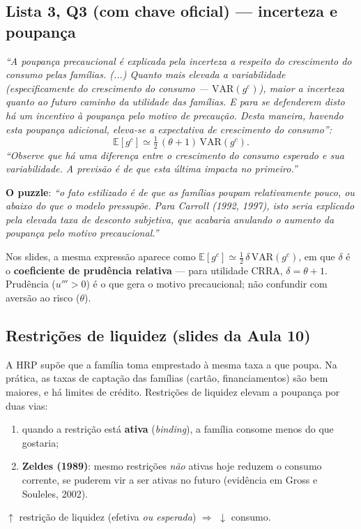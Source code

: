 \documentclass[12pt, a4paper]{article}
\newcommand{\E}{\mathbb{E}}
\newcommand{\VAR}{\mathrm{VAR}}
\begin{document}
\subsection{Lista 3, Q3 (com chave oficial) --- incerteza e poupança}

\begin{correctbox}[title={Chave oficial (Q3): motivo precaucional e conciliação com os fatos}]
\emph{``A poupança precaucional é explicada pela incerteza a respeito do
crescimento do consumo pelas famílias. (...) Quanto mais elevada a
variabilidade (especificamente do crescimento do consumo --- $\VAR(g^c)$),
maior a incerteza quanto ao futuro caminho da utilidade das famílias. E para
se defenderem disto há um incentivo à poupança pelo motivo de precaução. Desta
maneira, havendo esta poupança adicional, eleva-se a expectativa de
crescimento do consumo'':}
\[
\E[g^c] \simeq \tfrac{1}{2}\,(\theta + 1)\,\VAR(g^c).
\]
\emph{``Observe que há uma diferença entre o crescimento do consumo esperado e
sua variabilidade. A previsão é de que esta última impacta no primeiro.''}

\textbf{O puzzle}: \emph{``o fato estilizado é de que as famílias poupam
relativamente pouco, ou abaixo do que o modelo pressupõe. Para Carroll (1992,
1997), isto seria explicado pela elevada taxa de desconto subjetiva, que
acabaria anulando o aumento da poupança pelo motivo precaucional.''}
\end{correctbox}

Nos slides, a mesma expressão aparece como
$\E[g^c] \simeq \tfrac{1}{2}\,\delta\,\VAR(g^c)$, em que $\delta$ é o
\textbf{coeficiente de prudência relativa} --- para utilidade CRRA,
$\delta = \theta + 1$. Prudência ($u''' > 0$) é o que gera o motivo
precaucional; não confundir com aversão ao risco ($\theta$).

\subsection{Restrições de liquidez (slides da Aula 10)}

A HRP supõe que a família toma emprestado à mesma taxa a que poupa. Na
prática, as taxas de captação das famílias (cartão, financiamentos) são bem
maiores, e há limites de crédito. Restrições de liquidez elevam a poupança por
duas vias:
\begin{enumerate}[leftmargin=1.6em]
\item quando a restrição está \textbf{ativa} (\emph{binding}), a família
consome menos do que gostaria;
\item \textbf{Zeldes (1989)}: mesmo restrições \emph{não} ativas hoje reduzem
o consumo corrente, se puderem vir a ser ativas no futuro (evidência em Gross
e Souleles, 2002).
\end{enumerate}
\begin{center}
$\uparrow$ restrição de liquidez (efetiva \emph{ou esperada}) $\Rightarrow$
$\downarrow$ consumo.
\end{center}
\end{document}
